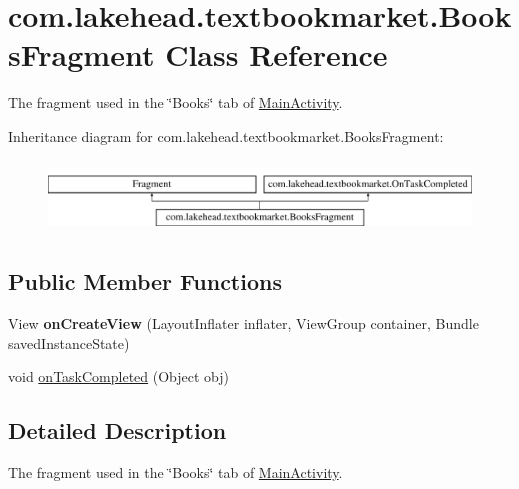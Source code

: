 \hypertarget{classcom_1_1lakehead_1_1textbookmarket_1_1_books_fragment}{\section{com.\-lakehead.\-textbookmarket.\-Books\-Fragment Class Reference}
\label{classcom_1_1lakehead_1_1textbookmarket_1_1_books_fragment}
}


The fragment used in the \char`\"{}\-Books\char`\"{} tab of \hyperlink{classcom_1_1lakehead_1_1textbookmarket_1_1_main_activity}{Main\-Activity}.  


Inheritance diagram for com.\-lakehead.\-textbookmarket.\-Books\-Fragment\-:\begin{figure}[H]
\begin{center}
\leavevmode
\includegraphics[height=1.924399cm]{classcom_1_1lakehead_1_1textbookmarket_1_1_books_fragment}
\end{center}
\end{figure}
\subsection*{Public Member Functions}
\begin{DoxyCompactItemize}
\item 
\hypertarget{classcom_1_1lakehead_1_1textbookmarket_1_1_books_fragment_a596c8e26d2638f4a27f64421652e58f8}{View {\bfseries on\-Create\-View} (Layout\-Inflater inflater, View\-Group container, Bundle saved\-Instance\-State)}\label{classcom_1_1lakehead_1_1textbookmarket_1_1_books_fragment_a596c8e26d2638f4a27f64421652e58f8}

\item 
void \hyperlink{classcom_1_1lakehead_1_1textbookmarket_1_1_books_fragment_a6aafce87d7f5a7b156690bee27513c37}{on\-Task\-Completed} (Object obj)
\end{DoxyCompactItemize}


\subsection{Detailed Description}
The fragment used in the \char`\"{}\-Books\char`\"{} tab of \hyperlink{classcom_1_1lakehead_1_1textbookmarket_1_1_main_activity}{Main\-Activity}. 

